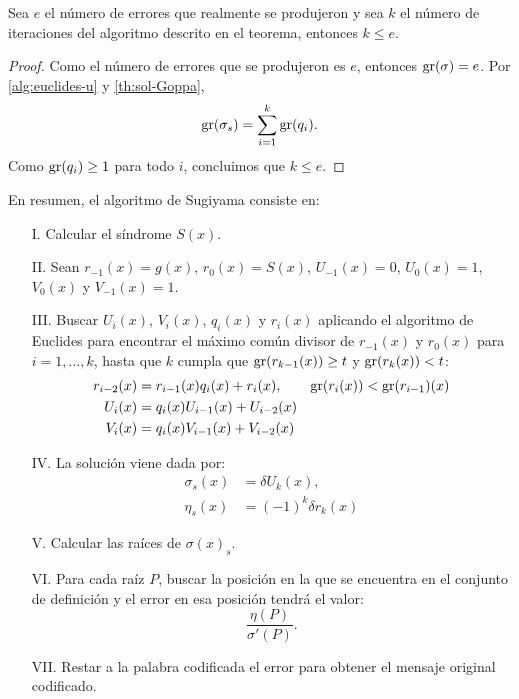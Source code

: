 \begin{corollary}
    Sea $e$ el número de errores que realmente se produjeron y sea $k$ el número de iteraciones del algoritmo descrito en el teorema, entonces $k \leq e$.
\end{corollary}

\begin{proof}
    Como el número de errores que se produjeron es $e$, entonces $\operatorname{gr}(\sigma) = e$. Por \eqref{alg:euclides-u} y \eqref{th:sol-Goppa},
    \[
        \operatorname{gr}(\sigma_s) = \sum_{i=1}^k \operatorname{gr}(q_i).
    \]
    Como $\operatorname{gr}(q_i) \geq 1$ para todo $i$, concluimos que $k \leq e$.
\end{proof}

En resumen, el algoritmo de Sugiyama consiste en:

\begin{itemize}
    \item[I.] Calcular el síndrome $S(x)$.
    \item[II.] Sean $r_{-1}(x) = g(x)$, $r_0(x) = S(x)$, $U_{-1}(x) = 0$, $U_0(x) = 1$, $V_0(x)$ y $V_{-1}(x) = 1$.
    \item[III.] Buscar $U_i(x)$, $V_i(x)$, $q_i(x)$ y $r_i(x)$ aplicando el algoritmo de Euclides para encontrar el máximo común divisor de $r_{-1}(x)$ y $r_0(x)$ para $i = 1,..., k$, hasta que $k$ cumpla que $\operatorname{gr}(r_{k-1}(x)) \geq t$ y $\operatorname{gr}(r_k(x)) < t$:
        \begin{equation*}
            \begin{split}
                r_{i-2}(x) &= r_{i-1}(x) q_i(x) + r_i(x), \qquad \operatorname{gr}(r_i(x)) < \operatorname{gr}(r_{i-1})(x)\\
                U_i(x) &= q_i(x) U_{i-1}(x) + U_{i-2}(x)\\
                V_i(x) &= q_i(x) V_{i-1}(x) + V_{i-2}(x)
            \end{split}
        \end{equation*}
    \item[IV.] La solución viene dada por:
        \begin{equation*}
            \begin{split}
                \sigma_s(x) &= \delta U_k (x), \\
                \eta_s(x) &= (-1)^k \delta r_k(x)
            \end{split}
        \end{equation*}  
    \item[V.] Calcular las raíces de $\sigma(x)_s$.
    \item[VI.] Para cada raíz $P$, buscar la posición en la que se encuentra en el conjunto de definición y el error en esa posición tendrá el valor:
        $$\frac{\eta(P)}{\sigma'(P)}.$$
    \item[VII.] Restar a la palabra codificada el error para obtener el mensaje original codificado.
\end{itemize}

